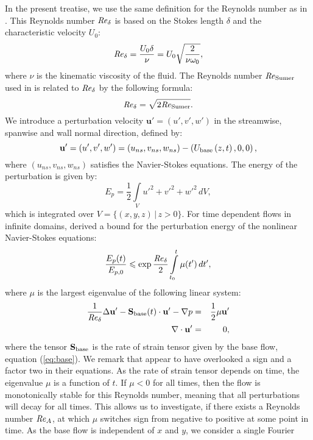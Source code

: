 \documentclass{jfm}
\let\le=\leqslant  \let\leq=\leqslant
\newcommand\be{\begin{equation}}
\newcommand\ee{\end{equation}}
\newcommand\bea{\begin{eqnarray}}
\newcommand\eea{\end{eqnarray}}
\newcommand\base{{\rm base}}
\newcommand\Rey{\mbox{\textit{Re}}}  %
\newcommand\sumer{{\rm Sumer}}
\begin{document}
In the present treatise,
we use the same definition for 
the Reynolds number as in \citet{OzdemirHsuBalachandar2013}.
This Reynolds number $ \Rey_\delta $
is based on the Stokes length $ \delta $ 
and the characteristic velocity $ U_0 $:
\be
\Rey_{\delta} = \frac{U_0 \delta}{\nu} = U_0 \sqrt{ \frac{ 2}{ \nu \omega_0} },
\ee
where $ \nu $ is the kinematic viscosity of the fluid. 
The Reynolds number $ \Rey_\sumer $ used in \citet{SumerJensenSorensenFredsoeLiuCarstensen2010} is related to $ \Rey_\delta $ by the following formula:
\be
\Rey_\delta = \sqrt{ 2 \Rey_\sumer }. 
\ee
We introduce a perturbation velocity $ \mathbf{u}' = (u',v',w' )$ in the 
streamwise, spanwise and wall normal direction, defined by:
\be
\mathbf{u}' = \left(u',v',w'\right) = \left(u_{ns},v_{ns},w_{ns} \right) 
- \left(U_\base \left(z,t \right),0,0\right),
\ee
where $ (u_{ns},v_{ns},w_{ns} ) $ satisfies the Navier-Stokes equations. The
energy of the perturbation is given by:
\be
E_p = \frac{1}{2} \int \limits_V u'^2 + v'^2 + w'^2 \, dV,
\ee
which is integrated over $ V = \{ (x,y,z) \, | \, z > 0 \} $. For time
dependent flows in infinite domains, \citet{DavisKerczek1973} derived
a bound for the perturbation energy of the nonlinear Navier-Stokes
equations:
\be
\frac{E_p(t)}{E_{p,0}} \le \exp \frac{\Rey_\delta}{2} \int \limits_{t_0}^t
\mu(t') \, dt',
\ee
where $ \mu $ is the largest eigenvalue of the following linear system:
\bea
\frac{1}{\Rey_\delta} \Delta \mathbf{u}' - \mathbf{S}_\base(t) \cdot
\mathbf{u}' - \nabla p &=& \frac{1}{2} \mu \mathbf{u}' \label{eq:davis1} \\
\nabla \cdot \mathbf{u}' &=& 0, \label{eq:davis2}
\eea
where the tensor $ \mathbf{S}_\base $ is the rate of strain tensor
given by the base flow, equation (\ref{eq:base}).
We remark
that \citet{DavisKerczek1973} appear to have overlooked a sign and a factor two in their
equations. As the rate of strain tensor depends on time,
the eigenvalue $ \mu $ is a function of $ t $.
If $ \mu < 0 $ for all times, then the flow is
monotonically stable for this Reynolds number, meaning that
all perturbations will decay for all times. This allows us
to investigate, if there exists a Reynolds number $ \Rey_A $,
at which $ \mu $ switches sign from negative to positive at some point in time.
As the base flow is independent of $ x $ and $ y $, we consider a single Fourier
\end{document}
